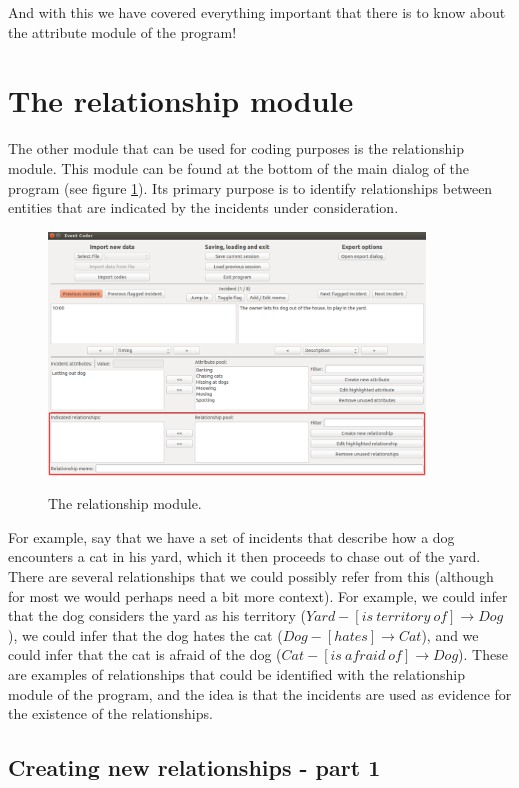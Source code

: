 \documentclass{memoir}
\begin{document}
And with this we have covered everything important that there is to know about the attribute module of the program!

\section{The relationship module}
\label{sec:relationshipmodule}

The other module that can be used for coding purposes is the relationship module. This module can be found at the bottom of the main dialog of the program (see figure \ref{fig:relationshipmodule}). Its primary purpose is to identify relationships between entities that are indicated by the incidents under consideration. 
\begin{figure}[h!]
  \centering
  \caption{The relationship module.}
  \includegraphics[width=100mm]{Screenshot_14.pdf}
  \label{fig:relationshipmodule}
\end{figure}

For example, say that we have a set of incidents that describe how a dog encounters a cat in his yard, which it then proceeds to chase out of the yard. There are several relationships that we could possibly refer from this (although for most we would perhaps need a bit more context). For example, we could infer that the dog considers the yard as his territory (\(Yard-[is\  territory\ of]\rightarrow Dog\)), we could infer that the dog hates the cat (\(Dog-[hates]\rightarrow Cat\)), and we could infer that the cat is afraid of the dog (\(Cat-[is\ afraid\ of]\rightarrow Dog\)). These are examples of relationships that could be identified with the relationship module of the program, and the idea is that the incidents are used as evidence for the existence of the relationships.

\subsection{Creating new relationships - part 1}
\label{sec:creatingnewrelationships1}
\end{document}
